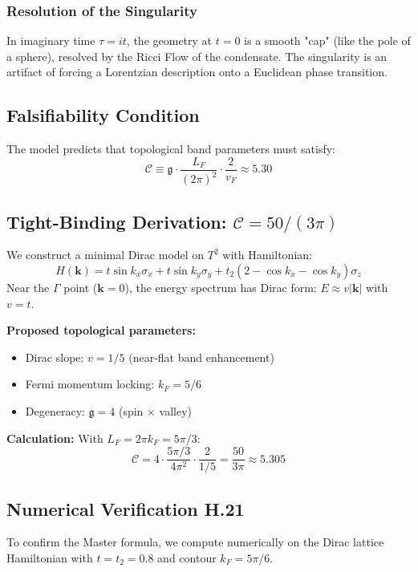 \documentclass[a4paper,12pt]{article}
\begin{document}
\subsubsection{Resolution of the Singularity}
In imaginary time $\tau = it$, the geometry at $t=0$ is a smooth "cap" (like the pole of a sphere), resolved by the Ricci Flow of the condensate. The singularity is an artifact of forcing a Lorentzian description onto a Euclidean phase transition.

\subsection{Falsifiability Condition}
The model predicts that topological band parameters must satisfy:
\begin{equation}
 \boxed{ \mathcal{C} \equiv \mathfrak{g} \cdot \frac{L_F}{(2\pi)^2} \cdot \frac{2}{v_F} \approx 5.30 }
\end{equation}

\subsection{Tight-Binding Derivation: $\mathcal{C} = 50/(3\pi)$}
We construct a minimal Dirac model on $T^2$ with Hamiltonian:
\begin{equation}
 H(\mathbf{k}) = t \sin k_x \sigma_x + t \sin k_y \sigma_y + t_2(2 - \cos k_x - \cos k_y) \sigma_z
\end{equation}
Near the $\Gamma$ point ($\mathbf{k} = 0$), the energy spectrum has Dirac form: $E \approx v|\mathbf{k}|$ with $v = t$.

\textbf{Proposed topological parameters:}
\begin{itemize}
    \item Dirac slope: $v = 1/5$ (near-flat band enhancement)
    \item Fermi momentum locking: $k_F = 5/6$
    \item Degeneracy: $\mathfrak{g} = 4$ (spin $\times$ valley)
\end{itemize}

\textbf{Calculation:}
With $L_F = 2\pi k_F = 5\pi/3$:
\begin{equation}
 \mathcal{C} = 4 \cdot \frac{5\pi/3}{4\pi^2} \cdot \frac{2}{1/5} = \frac{50}{3\pi} \approx 5.305
\end{equation}

\subsection{Numerical Verification H.21}
To confirm the Master formula, we compute numerically on the Dirac lattice Hamiltonian with $t = t_2 = 0.8$ and contour $k_F = 5\pi/6$.
\end{document}
